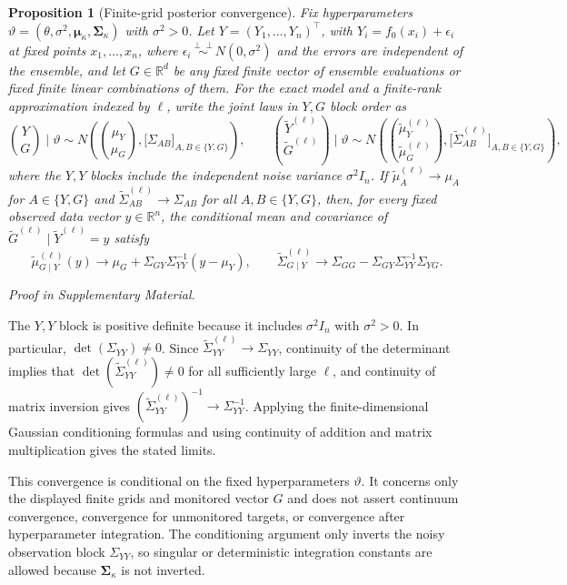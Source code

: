 \documentclass[11pt,a4paper]{article}
\newtheorem{proposition}{Proposition}
\theoremstyle{definition}
\theoremstyle{remark}
\newenvironment{mainproposition}[1][]{\begin{proposition}[#1]}{\par\noindent\emph{Proof in Supplementary Material.}\end{proposition}}
\newcommand{\indep}{\perp\!\!\!\perp}
\begin{document}
\begin{mainproposition}[Finite-grid posterior convergence]\label{prop:finite-grid-posterior-convergence}
Fix hyperparameters \(\vartheta=(\theta,\sigma^2,\boldsymbol\mu_\kappa,\boldsymbol\Sigma_\kappa)\) with \(\sigma^2>0\). Let \(Y=(Y_1,\ldots,Y_n)^\top\), with \(Y_i=f_0(x_i)+\epsilon_i\) at fixed points \(x_1,\ldots,x_n\), where \(\epsilon_i\overset{\indep}{\sim}N(0,\sigma^2)\) and the errors are independent of the ensemble, and let \(G\in\mathbb R^d\) be any fixed finite vector of ensemble evaluations or fixed finite linear combinations of them. For the exact model and a finite-rank approximation indexed by \(\ell\), write the joint laws in \(Y,G\) block order as
\[
\binom{Y}{G}\mid\vartheta
\sim
N\!\left(
\binom{\mu_Y}{\mu_G},
\bigl[\Sigma_{AB}\bigr]_{A,B\in\{Y,G\}}
\right),
\qquad
\binom{\widetilde Y^{(\ell)}}{\widetilde G^{(\ell)}}\mid\vartheta
\sim
N\!\left(
\binom{\widetilde\mu_Y^{(\ell)}}{\widetilde\mu_G^{(\ell)}},
\bigl[\widetilde\Sigma_{AB}^{(\ell)}\bigr]_{A,B\in\{Y,G\}}
\right),
\]
where the \(Y,Y\) blocks include the independent noise variance \(\sigma^2 I_n\). If \(\widetilde\mu_A^{(\ell)}\to\mu_A\) for \(A\in\{Y,G\}\) and \(\widetilde\Sigma_{AB}^{(\ell)}\to\Sigma_{AB}\) for all \(A,B\in\{Y,G\}\), then, for every fixed observed data vector \(y\in\mathbb R^n\), the conditional mean and covariance of \(\widetilde G^{(\ell)}\mid \widetilde Y^{(\ell)}=y\) satisfy
\[
\widetilde\mu_{G\mid Y}^{(\ell)}(y) \to
\mu_G+\Sigma_{GY}\Sigma_{YY}^{-1}(y-\mu_Y),\qquad
\widetilde\Sigma_{G\mid Y}^{(\ell)} \to \Sigma_{GG}-\Sigma_{GY}\Sigma_{YY}^{-1}\Sigma_{YG}.
\]
\end{mainproposition}

\begin{mainproof}
The \(Y,Y\) block is positive definite because it includes \(\sigma^2 I_n\) with \(\sigma^2>0\). In particular, \(\det(\Sigma_{YY})\neq0\). Since \(\widetilde\Sigma_{YY}^{(\ell)}\to\Sigma_{YY}\), continuity of the determinant implies that \(\det(\widetilde\Sigma_{YY}^{(\ell)})\neq0\) for all sufficiently large \(\ell\), and continuity of matrix inversion gives \((\widetilde\Sigma_{YY}^{(\ell)})^{-1}\to\Sigma_{YY}^{-1}\). Applying the finite-dimensional Gaussian conditioning formulas and using continuity of addition and matrix multiplication gives the stated limits.
\end{mainproof}

This convergence is conditional on the fixed hyperparameters \(\vartheta\). It concerns only the displayed finite grids and monitored vector \(G\) and does not assert continuum convergence, convergence for unmonitored targets, or convergence after hyperparameter integration. The conditioning argument only inverts the noisy observation block \(\Sigma_{YY}\), so singular or deterministic integration constants are allowed because \(\boldsymbol\Sigma_\kappa\) is not inverted.
\end{document}
